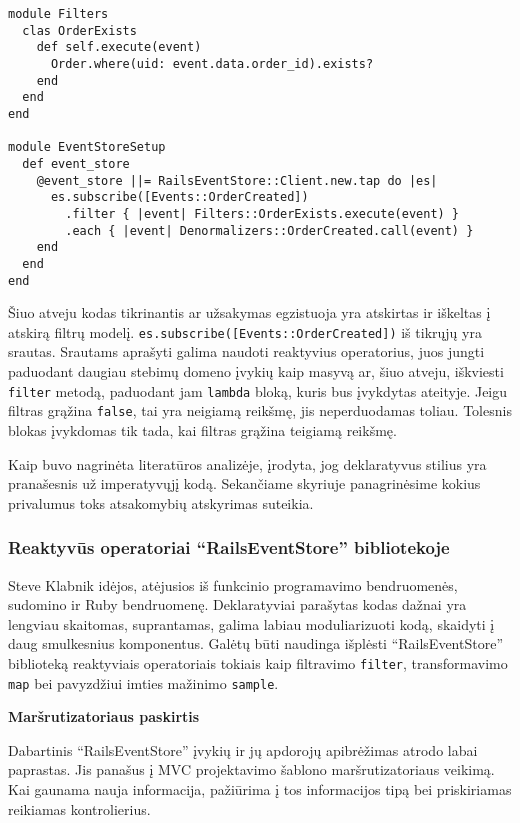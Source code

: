 \begin{lstlisting}
module Filters
  clas OrderExists
    def self.execute(event)
      Order.where(uid: event.data.order_id).exists?
    end
  end
end

module EventStoreSetup
  def event_store
    @event_store ||= RailsEventStore::Client.new.tap do |es|
      es.subscribe([Events::OrderCreated])
        .filter { |event| Filters::OrderExists.execute(event) }
        .each { |event| Denormalizers::OrderCreated.call(event) }
    end
  end
end
\end{lstlisting}

Šiuo atveju kodas tikrinantis ar užsakymas egzistuoja yra atskirtas ir iškeltas į atskirą filtrų modelį. \lstinline|es.subscribe([Events::OrderCreated])| iš tikrųjų yra srautas. Srautams aprašyti galima naudoti reaktyvius operatorius, juos jungti paduodant daugiau stebimų domeno įvykių kaip masyvą ar, šiuo atveju, iškviesti \lstinline|filter| metodą, paduodant jam \lstinline|lambda| bloką, kuris bus įvykdytas ateityje. Jeigu filtras grąžina \lstinline|false|, tai yra neigiamą reikšmę, jis neperduodamas toliau. Tolesnis blokas įvykdomas tik tada, kai filtras grąžina teigiamą reikšmę.

Kaip buvo nagrinėta literatūros analizėje, įrodyta, jog deklaratyvus stilius yra pranašesnis už imperatyvųjį kodą. Sekančiame skyriuje panagrinėsime kokius privalumus toks atsakomybių atskyrimas suteikia.

\subsubsection{Reaktyvūs operatoriai ``RailsEventStore'' bibliotekoje}

Steve Klabnik idėjos, atėjusios iš funkcinio programavimo bendruomenės, sudomino ir Ruby bendruomenę. Deklaratyviai parašytas kodas dažnai yra lengviau skaitomas, suprantamas, galima labiau moduliarizuoti kodą, skaidyti į daug smulkesnius komponentus. Galėtų būti naudinga išplėsti ``RailsEventStore'' biblioteką reaktyviais operatoriais tokiais kaip filtravimo \lstinline|filter|, transformavimo \lstinline|map| bei pavyzdžiui imties mažinimo \lstinline|sample|.

\textbf{Maršrutizatoriaus paskirtis}

Dabartinis ``RailsEventStore'' įvykių ir jų apdorojų apibrėžimas atrodo labai paprastas. Jis panašus į MVC projektavimo šablono maršrutizatoriaus veikimą. Kai gaunama nauja informacija, pažiūrima į tos informacijos tipą bei priskiriamas reikiamas kontrolierius.

